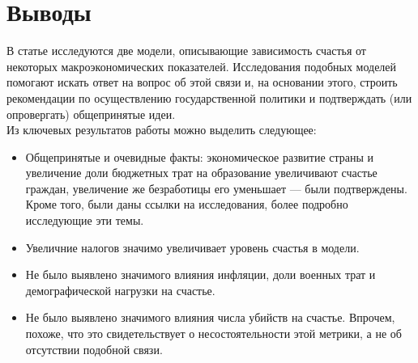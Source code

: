 \documentclass[russian]{vegareport}
\begin{document}
    
    \chapter{Выводы}
        В статье исследуются две модели, описывающие зависимость счастья от некоторых макроэкономических показателей. Исследования подобных моделей помогают искать ответ на вопрос об этой связи и, на основании этого, строить рекомендации по осуществлению государственной политики и подтверждать (или опровергать) общепринятые идеи.
        \\
        Из ключевых результатов работы можно выделить следующее:
        \begin{itemize}
            \item Общепринятые и очевидные факты: экономическое развитие страны и увеличение доли бюджетных трат на образование увеличивают счастье граждан, увеличение же безработицы его уменьшает --- были подтверждены. Кроме того, были даны ссылки на исследования, более подробно исследующие эти темы.
            \item Увеличние налогов значимо увеличивает уровень счастья в модели.  
            \item Не было выявлено значимого влияния инфляции, доли военных трат и демографической нагрузки на счастье.
            \item Не было выявлено значимого влияния числа убийств на счастье. Впрочем, похоже, что это свидетельствует о несостоятельности этой метрики, а не об отсутствии подобной связи. 
        \end{itemize}
        
\end{document}
